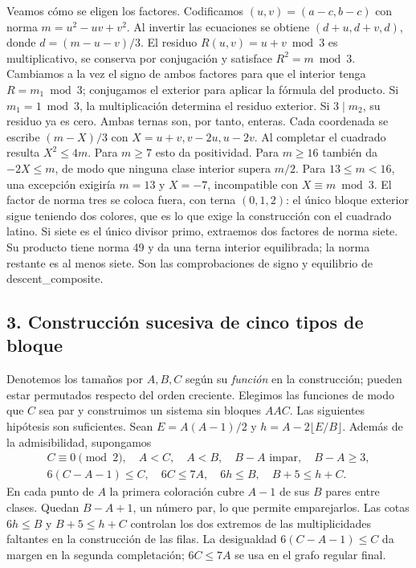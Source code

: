 \documentclass[spanish,11pt,a4paper]{article}
\begin{document}
Veamos cómo se eligen los factores. Codificamos \((u,v)=(a-c,b-c)\) con norma \(m=u^2-uv+v^2\). Al invertir las ecuaciones se obtiene \((d+u,d+v,d)\), donde \(d=(m-u-v)/3\). El residuo \(R(u,v)=u+v\bmod 3\) es multiplicativo, se conserva por conjugación y satisface \(R^2=m\bmod3\). Cambiamos a la vez el signo de ambos factores para que el interior tenga \(R=m_1\bmod3\); conjugamos el exterior para aplicar la fórmula del producto. Si \(m_1=1\bmod3\), la multiplicación determina el residuo exterior. Si \(3\mid m_2\), su residuo ya es cero. Ambas ternas son, por tanto, enteras. Cada coordenada se escribe \((m-X)/3\) con \(X=u+v,v-2u,u-2v\). Al completar el cuadrado resulta \(X^2\le4m\). Para \(m\ge7\) esto da positividad. Para \(m\ge16\) también da \(-2X\le m\), de modo que ninguna clase interior supera \(m/2\). Para \(13\le m<16\), una excepción exigiría \(m=13\) y \(X=-7\), incompatible con \(X\equiv m\bmod3\). El factor de norma tres se coloca fuera, con terna \((0,1,2)\): el único bloque exterior sigue teniendo dos colores, que es lo que exige la construcción con el cuadrado latino. Si siete es el único divisor primo, extraemos dos factores de norma siete. Su producto tiene norma 49 y da una terna interior equilibrada; la norma restante es al menos siete. Son las comprobaciones de signo y equilibrio de descent\_composite.

\subsection{3. Construcción sucesiva de cinco tipos de bloque}\label{construcciuxf3n-sucesiva-de-cinco-tipos-de-bloque}

Denotemos los tamaños por \(A,B,C\) según su \emph{función} en la construcción; pueden estar permutados respecto del orden creciente. Elegimos las funciones de modo que \(C\) sea par y construimos un sistema sin bloques \(AAC\). Las siguientes hipótesis son suficientes. Sean \(E=A(A-1)/2\) y \(h=A-2\lfloor E/B\rfloor\). Además de la admisibilidad, supongamos \[\begin{gathered}
 C\equiv0\pmod2,\quad A<C,\quad A<B,\quad B-A\text{ impar},\quad B-A\ge3,\\
 6(C-A-1)\le C,\quad 6C\le7A,\quad 6h\le B,\quad B+5\le h+C .
\end{gathered}\] En cada punto de \(A\) la primera coloración cubre \(A-1\) de sus \(B\) pares entre clases. Quedan \(B-A+1\), un número par, lo que permite emparejarlos. Las cotas \(6h\le B\) y \(B+5\le h+C\) controlan los dos extremos de las multiplicidades faltantes en la construcción de las filas. La desigualdad \(6(C-A-1)\le C\) da margen en la segunda completación; \(6C\le7A\) se usa en el grafo regular final.
\end{document}
